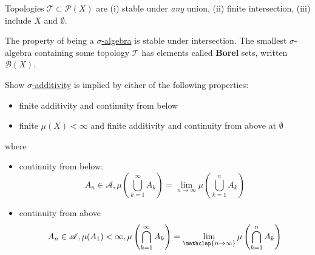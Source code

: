 \documentclass[twoside]{article}
\newcommand{\powerset}{\mathscr{P}}
\begin{document}
\begin{remark}
    Topologies $\mathscr{T} \subset \powerset(X)$ are (i) stable under \textit{any} union, (ii) finite intersection, (iii) include $X$ and $\emptyset$.
\end{remark}

\begin{remark}
    The property of being a \hyperlink{def:sigAlg}{$\sigma$-algebra} is stable under intersection.
    The smallest $\sigma$-algebra containing some topology $\mathscr{T}$ has elements called \hypertarget{def:borelSet}{\textbf{Borel} sets}, written $\mathcal{B}(X)$.
\end{remark}


\begin{ex}
    Show \hyperlink{def:sigAdd}{$\sigma$-additivity} is implied by either of the following properties:
    \begin{itemize}
        \item finite additivity and continuity from below
        \item finite $\mu(X) < \infty$ and finite additivity and continuity from above at $\emptyset$
    \end{itemize}
    where
    \begin{itemize}
        \item continuity from below:
            \begin{equation*}
                A_n \in \mathscr{A}, \mu\left(\bigcup_{k=1}^\infty A_k\right)  = \lim_{n \to \infty} \mu\left(\bigcup_{k=1}^n A_k\right)
            \end{equation*}
        \item continuity from above
            \begin{equation*}
                A_n \in \mathscr{A}, \mu(A_1) < \infty, \mu\left(\bigcap_{k=1}^\infty A_k\right)  = \lim_{\mathclap{n \to \infty}} \mu\left(\bigcap_{k=1}^n A_k\right)
            \end{equation*}
    \end{itemize}
\end{ex}
\end{document}
